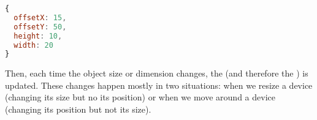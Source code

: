 \begin{lstlisting}[language=JavaScript,label=cookiehash,
  caption=Cookie Hash example]
{
  offsetX: 15,
  offsetY: 50,
  height: 10,
  width: 20
}
\end{lstlisting}

Then, each time the object size or dimension changes, the  (and therefore the ) is updated.
These changes happen mostly in two situations: when we resize a device (changing its size but no its position) or when we move around a device (changing its position but not its size).


